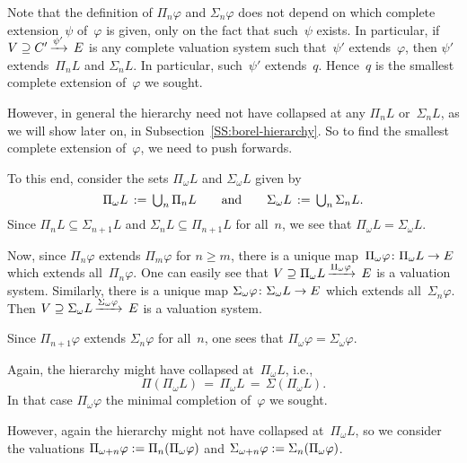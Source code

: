 Note that the definition of $\Pi_n \varphi$
and $\Sigma_n \varphi$ does not depend
on which complete extension~$\psi$ of~$\varphi$ is given,
only on the fact that such~$\psi$ exists.
In particular,
if $V \supseteq C'\,\smash{\xrightarrow{\psi'}\,E}$ is any complete valuation system
such that~$\psi'$ extends~$\varphi$,
then $\psi'$ extends~$\Pi_n L$ and $\Sigma_n L$.
In particular,
such~$\psi'$ extends~$q$.
Hence~$q$ is the smallest complete extension of~$\varphi$ we sought.

However,
in general the hierarchy need not have collapsed at
any $\Pi_n L$ or~$\Sigma_n L$,
as we will show later on, in Subsection~\ref{SS:borel-hierarchy}.
So to find the smallest complete extension of~$\varphi$,
we need to push forwards.

To this end, consider the sets $\Pi_\omega L$
and $\Sigma_\omega L$ given by
\begin{equation*}
\Pi_\omega L \,:=\,\textstyle{\bigcup_n}\, \Pi_n L
\qquad\text{and}\qquad
\Sigma_\omega L \,:=\, \textstyle{\bigcup_n}\, \Sigma_n L.
\end{equation*}
Since $\Pi_{n} L \subseteq \Sigma_{n+1} L$
and $\Sigma_{n} L \subseteq \Pi_{n+1}L$ for all~$n$,
we see that $\Pi_\omega L = \Sigma_\omega L$.

Now,
since $\Pi_n\varphi$ extends $\Pi_m\varphi$
for $n\geq m$,
there is a unique map~$\Pi_\omega \varphi\colon \Pi_\omega L \rightarrow E$
which extends all~$\Pi_n \varphi$.
One can easily see that $V \supseteq \Pi_\omega L\,\smash{\xrightarrow{\Pi_\omega\varphi}\,E}$
is a valuation system.
Similarly, there is a unique map 
$\Sigma_\omega \varphi \colon \Sigma_\omega L \rightarrow E$
which extends all~$\Sigma_n\varphi$.
Then $V \supseteq \Sigma_\omega L\,\smash{\xrightarrow{\Sigma_\omega\varphi}\,E}$
is a valuation system.

Since $\Pi_{n+1}\varphi$ extends $\Sigma_{n}\varphi$
for all~$n$, one sees that $\Pi_\omega\varphi = \Sigma_\omega\varphi$.

Again, the hierarchy might have collapsed at~$\Pi_\omega L$,
i.e.,
\begin{equation*}
\Pi(\Pi_\omega L ) \,=\, \Pi_\omega L \,=\, \Sigma(\Pi_\omega L).
\end{equation*}
In that case $\Pi_\omega\varphi$ the minimal completion of~$\varphi$
we sought.

However,
again the hierarchy
might not have collapsed at~$\Pi_\omega L$,
so we consider the valuations
 $\Pi_{\omega+n}\varphi:=\Pi_{n} (\Pi_\omega \varphi)$
and $\Sigma_{\omega+n}\varphi := \Sigma_{n}(\Pi_\omega\varphi)$.

